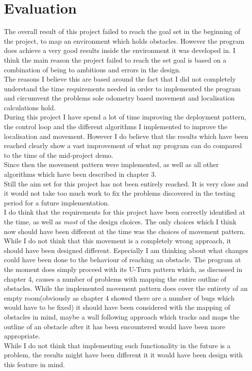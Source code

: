 \chapter{Evaluation}
\label{Evaluation}
The overall result of this project failed to reach the goal set in the beginning of the project, to map an environment which holds obstacles. However the program does achieve a very good results inside the environment it was developed in. I think the main reason the project failed to reach the set goal is based on a combination of being to ambitious and errors in the design.\\[3ex]

The reasons I believe this are based around the fact that I did not completely understand the time requirements needed in order to implemented the program and circumvent the problems sole odometry based movement and localisation calculations hold. \\
During this project I have spend a lot of time improving the deployment pattern, the control loop and the different algorithms I implemented to improve the localisation and movement. 
However I do believe that the results which have been reached clearly show a vast improvement of what my program can do compared to the time of the mid-project demo. \\
Since then the movement pattern were implemented, as well as all other algorithms which have been described in chapter 3. \\
Still the aim set for this project has not been entirely reached.
It is very close and it would not take too much work to fix the problems discovered in the testing period for a future implementation. \\[3ex]

I do think that the requirements for this project have been correctly identified at the time, as well as \textit{most} of the design choices. The only choices which I think now should have been different at the time was the choices of movement pattern.\\
While I do not think that this movement is a completely wrong approach, it should have been designed different. 
Especially I am thinking about what changes could have been done to the behaviour of reaching an obstacle. 
The program at the moment does simply proceed with its U-Turn pattern which, as discussed in chapter 4, causes a number of problems with mapping the entire outline of obstacles. 
While the implemented movement pattern does cover the entirety of an empty room(obviously as chapter 4 showed there are a number of bugs which would have to be fixed) it should have been considered with the mapping of obstacles in mind, maybe a wall following approach which tracks and maps the outline of an obstacle after it has been encountered would have been more appropriate.\\
While I do not think that implementing such functionality in the future is a problem, the results might have been different it it would have been design with this feature in mind.\\[3ex]

